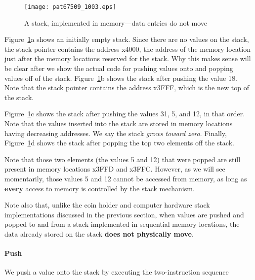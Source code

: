 \documentclass{patt}
\begin{document}
\begin{figure}[h]
\begin{minipage}{36pc}
\centerline{\texttt{[image: pat67509\_1003.eps]}}
\end{minipage}
\caption{A stack, implemented in memory---data entries do not move}
\label{fig:stack.in.memory}
\end{figure}

\noindent
Figure~\ref{fig:stack.in.memory}a shows an initially empty stack.  Since
there are no values on the stack, the stack pointer contains the address x4000, 
the address of the memory location just after the memory locations reserved for
the stack.  Why this makes sense will be clear after we show the actual
code for pushing values onto and popping values off of the stack.  
Figure~\ref{fig:stack.in.memory}b shows the stack after pushing
the value 18. Note that the stack pointer contains the address x3FFF, which
is the new top of the stack.

Figure~\ref{fig:stack.in.memory}c shows the stack after pushing the values 
31, 5, and 12, in that order. Note that the values inserted into the stack
are stored in memory locations having decreasing addresses.  We say the stack 
{\em grows toward zero}.  Finally, Figure~\ref{fig:stack.in.memory}d shows 
the stack after popping the top two elements off the stack.  

Note that those two elements (the values 5 and 12) that were popped are still 
present in memory locations x3FFD and x3FFC. However, as we will see 
momentarily, those values 5 and 12 cannot be accessed from memory, as long as 
{\bf every} access to memory is controlled by the stack mechanism.

Note also that, unlike the coin holder and computer hardware stack 
implementations
discussed in the previous section, when values are pushed and popped to and 
from a stack implemented in sequential memory locations, the data already 
stored on the stack {\bf does not physically move}.  

\paragraph{Push}

We push a value onto the stack by executing the two-instruction sequence

\end{document}
